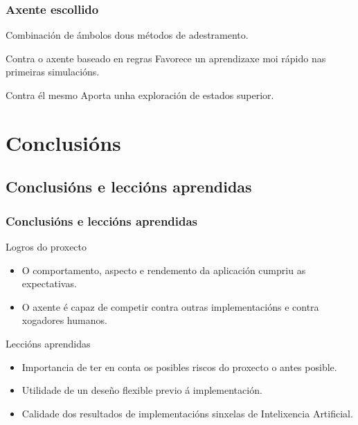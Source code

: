 \documentclass{beamer}
\begin{document}
\begin{frame}
\frametitle{Axente escollido}
Combinación de ámbolos dous métodos de adestramento.

\begin{block}{Contra o axente baseado en regras}
	Favorece un aprendizaxe moi rápido nas primeiras simulacións.
\end{block}

\begin{block}{Contra él mesmo}
	Aporta unha exploración de estados superior.
\end{block}
\note{

}
\end{frame}


\section{Conclusións}

\subsection{Conclusións e leccións aprendidas}
\begin{frame}
\frametitle{Conclusións e leccións aprendidas}
\begin{block}{Logros do proxecto}
\begin{itemize}
	\item O comportamento, aspecto e rendemento da aplicación cumpriu as expectativas.
	\item O axente é capaz de competir contra outras implementacións e contra xogadores humanos.
\end{itemize}
\end{block}

\begin{block}{Leccións aprendidas}
	\begin{itemize}
		\item Importancia de ter en conta os posibles riscos do proxecto o antes posible.
		\item Utilidade de un deseño flexible previo á implementación.
		\item Calidade dos resultados de implementacións sinxelas de Intelixencia Artificial.
	\end{itemize}
\end{block}

\end{frame}
\end{document}
